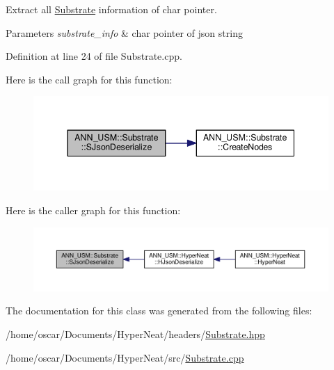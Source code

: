 Extract all \hyperlink{class_a_n_n___u_s_m_1_1_substrate}{Substrate} information of char pointer. 


\begin{DoxyParams}{Parameters}
{\em substrate\-\_\-info} & char pointer of json string \\
\hline
\end{DoxyParams}


Definition at line 24 of file Substrate.\-cpp.



Here is the call graph for this function\-:\nopagebreak
\begin{figure}[H]
\begin{center}
\leavevmode
\includegraphics[width=344pt]{class_a_n_n___u_s_m_1_1_substrate_a5e3ad4577e03d0c4dbb2eef576d0e6a9_cgraph}
\end{center}
\end{figure}




Here is the caller graph for this function\-:\nopagebreak
\begin{figure}[H]
\begin{center}
\leavevmode
\includegraphics[width=350pt]{class_a_n_n___u_s_m_1_1_substrate_a5e3ad4577e03d0c4dbb2eef576d0e6a9_icgraph}
\end{center}
\end{figure}




The documentation for this class was generated from the following files\-:\begin{DoxyCompactItemize}
\item 
/home/oscar/\-Documents/\-Hyper\-Neat/headers/\hyperlink{_substrate_8hpp}{Substrate.\-hpp}\item 
/home/oscar/\-Documents/\-Hyper\-Neat/src/\hyperlink{_substrate_8cpp}{Substrate.\-cpp}\end{DoxyCompactItemize}
